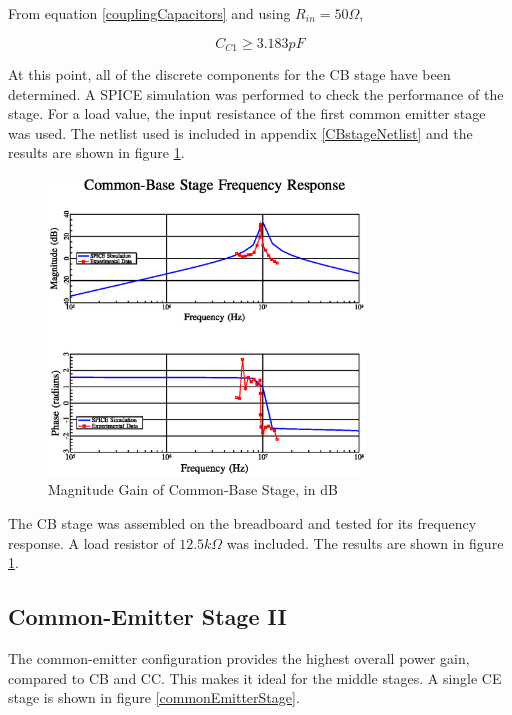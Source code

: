 \documentclass[titlepage, letterpaper, 10.5pt]{article}
\begin{document}
From equation \ref{couplingCapacitors} and using $R_{in}=50\Omega$,

\begin{equation*}
C_{C1}\geq 3.183pF
\end{equation*}

At this point, all of the discrete components for the CB stage have
been determined. A SPICE simulation was performed to check the
performance of the stage. For a load value, the input resistance of
the first common emitter stage was used. The netlist used is included
in appendix \ref{CBstageNetlist} and the results are shown in figure
\ref{CBstageMagnitudePlot}.

\begin{figure}[ht]
	\centering
	\includegraphics[width=0.75\textwidth]
		{mathGL/cbStage.eps}
	\caption{
		Magnitude Gain of Common-Base Stage, in dB
	}
	\label{CBstageMagnitudePlot}
\end{figure}

The CB stage was assembled on the breadboard and tested for its
frequency response. A load resistor of $12.5k\Omega$ was included.
The results are shown in figure \ref{CBstageMagnitudePlot}.

\subsection{Common-Emitter Stage II}
\label{stage2section}

The common-emitter configuration provides the highest overall power
gain, compared to CB and CC. This makes it ideal for the middle
stages. A single CE stage is shown in figure 
\ref{commonEmitterStage}.
\end{document}
